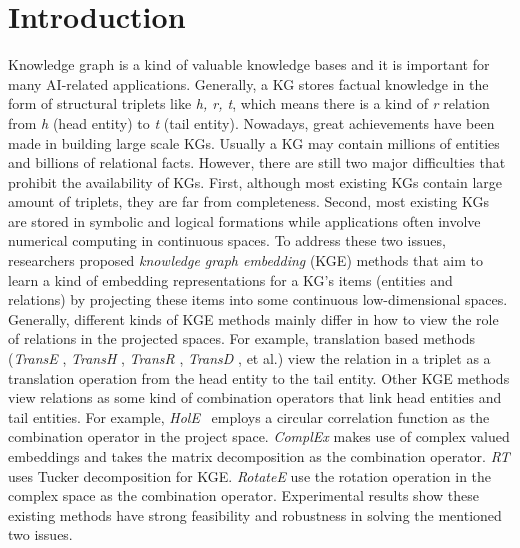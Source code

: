 \documentclass[11pt]{article}
\begin{document}
\section{Introduction}
Knowledge graph is a kind of valuable knowledge bases and it is important for many AI-related applications. Generally, a KG stores factual knowledge in the form of structural triplets like \emph{h, r, t}, which means there is a kind of \emph{r} relation from \emph{h} (head entity) to \emph{t} (tail entity). Nowadays, great achievements have been made in building large scale KGs. Usually a KG may contain millions of entities and billions of relational facts. However, there are still two major difficulties that prohibit the availability of KGs. First, although most  existing KGs contain large amount of triplets, they are far from completeness. Second, most existing KGs are stored in symbolic and logical formations while applications often involve numerical computing in continuous spaces. To address these two issues, researchers proposed {\em knowledge graph embedding} (KGE) methods that aim to learn a kind of  embedding representations for a KG’s items (entities and relations) by projecting these items into some continuous low-dimensional spaces. Generally, different kinds of KGE methods mainly differ in how to view the role of relations in the projected spaces. For example, translation based methods (\emph{TransE} \cite{Bordes:2013}, \emph{TransH} \cite{Wang:2014}, \emph{TransR} \cite{Lin:2015a}, \emph{TransD} \cite{Ji:2015}, et al.) view the relation in a triplet as a translation operation from the head entity to the tail entity. Other KGE methods view relations as some kind of combination operators that link head entities and tail entities. For example, \emph{HolE}~\cite{Nickel:2016} employs a circular correlation function as the combination operator in the project space. \emph{ComplEx} \cite{Trouillon:2016} makes use of complex valued embeddings and takes the matrix decomposition as the combination operator. \emph{RT} \cite{Wang:2019}uses Tucker decomposition for KGE. \emph{RotateE} \cite{Sun:2019} use the rotation operation in the complex space as the combination operator. Experimental results show  these existing  methods have strong feasibility and robustness in solving the mentioned two issues.
\end{document}
